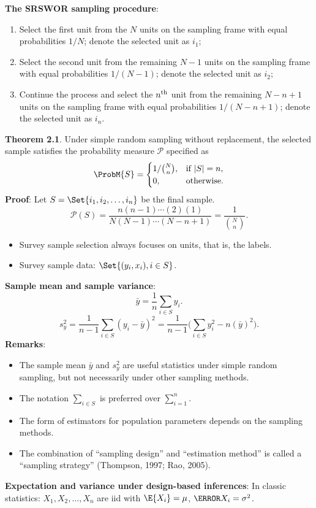 \documentclass[oneside]{book}\usepackage[]{graphicx}\usepackage[svgnames]{xcolor}
\DeclarePairedDelimiter\abs{\lvert}{\rvert}
\begin{document}
\textbf{The SRSWOR sampling procedure}:
\begin{enumerate}[(1)]
      \item Select the first unit from the $N$ units on the sampling frame with
            equal probabilities $1/N$; denote the selected unit as $i_1$;
      \item Select the second unit from the remaining $ N-1 $ units on the
            sampling frame with equal probabilities $ 1/(N-1) $; denote the
            selected unit as $i_2$;
      \item Continue the process and select the $n\textsuperscript{th}$ unit from the remaining
            $ N-n+1 $ units on the sampling frame with equal probabilities
            $ 1/(N-n+1) $; denote the selected unit as $ i_n $.
\end{enumerate}
\begin{Result}{}
      \textbf{Theorem 2.1}. Under simple random sampling without replacement,
      the selected sample satisfies the probability measure $ \mathcal{P} $ specified as
      \[ \ProbM{S}=\begin{cases}
                  1/\binom{N}{n}, & \text{if $ \abs{S}=n $}, \\
                  0,              & \text{otherwise}.
            \end{cases} \]
      \tcblower{}
      \textbf{Proof}: Let $ S=\Set{i_1,i_2,\ldots,i_n} $ be the final sample.
      \[ \mathcal{P}(S)=\frac{n(n-1)\cdots(2)(1)}{N(N-1)\cdots(N-n+1)}=\frac{1}{\binom{N}{n}}. \]
\end{Result}
\begin{itemize}
      \item Survey sample selection always focuses on units, that is, the labels.
      \item Survey sample data: $ \Set{(y_i,x_i),i\in S} $.
\end{itemize}
\textbf{Sample mean and sample variance}:
\[ \bar{y}=\frac{1}{n}\sum_{i\in S}y_i. \]
\[ s_y^2=\frac{1}{n-1}\sum_{i\in S}(y_i-\bar{y})^2=\frac{1}{n-1}\biggl(\sum_{i\in S}y_i^2-n(\bar{y})^2\biggr). \]
\textbf{Remarks}:
\begin{itemize}
      \item The sample mean $ \bar{y} $ and $ s_y^2 $ are useful
            statistics under simple random sampling, but not necessarily under
            other sampling methods.
      \item The notation $ \sum_{i\in S} $ is preferred over
            $ \sum_{i=1}^{n} $.
      \item The form of estimators for population parameters depends on the
            sampling methods.
      \item The combination of ``sampling design'' and ``estimation method''
            is called a ``sampling strategy'' (Thompson, 1997; Rao, 2005).
\end{itemize}
\textbf{Expectation and variance under design-based inferences}:
In classic statistics: $ X_1,X_2,\ldots,X_n $ are iid with $ \E{X_i}=\mu $,
$ \V{X_i}=\sigma^2 $.
\end{document}
